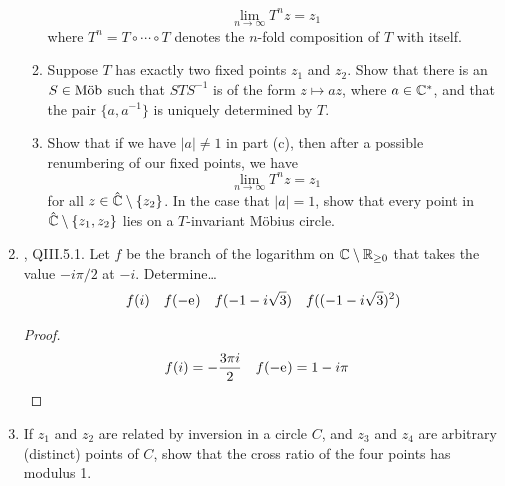 \documentclass[../psets.tex]{subfiles}
\begin{document}
\begin{enumerate}[ref={A.\arabic*}]
\begin{enumerate}
        \begin{equation*}
            \lim_{n\to\infty}T^nz = z_1
        \end{equation*}
        where $T^n=T\circ\cdots\circ T$ denotes the $n$-fold composition of $T$ with itself.
        \item Suppose $T$ has exactly two fixed points $z_1$ and $z_2$. Show that there is an $S\in\operatorname{M\ddot{o}b}$ such that $STS^{-1}$ is of the form $z\mapsto az$, where $a\in\mathbb{C}^*$, and that the pair $\{a,a^{-1}\}$ is uniquely determined by $T$.
        \item Show that if we have $|a|\neq 1$ in part (c), then after a possible renumbering of our fixed points, we have
        \begin{equation*}
            \lim_{n\to\infty}T^nz = z_1
        \end{equation*}
        for all $z\in\hat{\mathbb{C}}\setminus\{z_2\}$. In the case that $|a|=1$, show that every point in $\hat{\mathbb{C}}\setminus\{z_1,z_2\}$ lies on a $T$-invariant M\"{o}bius circle.
    \end{enumerate}
    \item \textcite{bib:FischerLieb}, QIII.5.1. Let $f$ be the branch of the logarithm on $\mathbb{C}\setminus\mathbb{R}_{\geq 0}$ that takes the value $-i\pi/2$ at $-i$. Determine\dots
    \begin{align*}
        f(i)&&
        f(-\text{e}^{})&&
        f(-1-i\sqrt{3})&&
        f((-1-i\sqrt{3})^2)
    \end{align*}
    \begin{proof}
        \begin{align*}
            f(i) &= -\frac{3\pi i}{2}&
            f(-\text{e}^{}) &= 1-i\pi
        \end{align*}
    \end{proof}
    \item If $z_1$ and $z_2$ are related by inversion in a circle $C$, and $z_3$ and $z_4$ are arbitrary (distinct) points of $C$, show that the cross ratio of the four points has modulus 1.
\end{enumerate}
\end{document}
